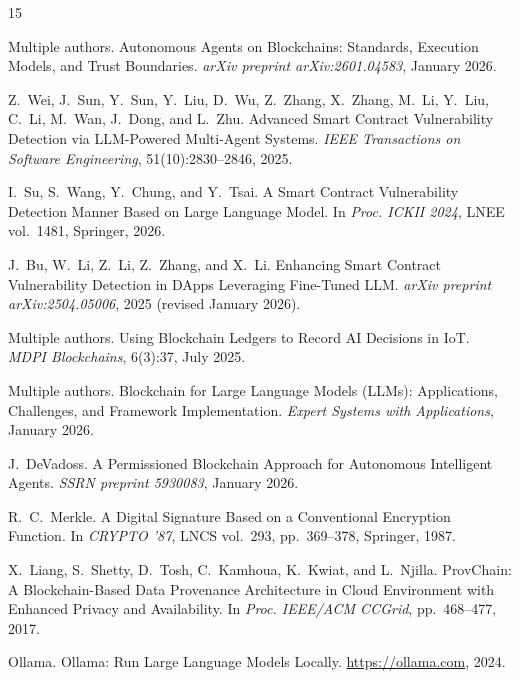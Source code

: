 \documentclass[manuscript,nonacm]{acmart}
\begin{document}
\begin{thebibliography}{15}

Multiple authors.
\newblock Autonomous Agents on Blockchains: Standards, Execution Models, and Trust Boundaries.
\newblock \emph{arXiv preprint arXiv:2601.04583}, January 2026.

Z.~Wei, J.~Sun, Y.~Sun, Y.~Liu, D.~Wu, Z.~Zhang, X.~Zhang, M.~Li, Y.~Liu, C.~Li, M.~Wan, J.~Dong, and L.~Zhu.
\newblock Advanced Smart Contract Vulnerability Detection via LLM-Powered Multi-Agent Systems.
\newblock \emph{IEEE Transactions on Software Engineering}, 51(10):2830--2846, 2025.

I.~Su, S.~Wang, Y.~Chung, and Y.~Tsai.
\newblock A Smart Contract Vulnerability Detection Manner Based on Large Language Model.
\newblock In \emph{Proc. ICKII 2024}, LNEE vol.~1481, Springer, 2026.

J.~Bu, W.~Li, Z.~Li, Z.~Zhang, and X.~Li.
\newblock Enhancing Smart Contract Vulnerability Detection in DApps Leveraging Fine-Tuned LLM.
\newblock \emph{arXiv preprint arXiv:2504.05006}, 2025 (revised January 2026).

Multiple authors.
\newblock Using Blockchain Ledgers to Record AI Decisions in IoT.
\newblock \emph{MDPI Blockchains}, 6(3):37, July 2025.

Multiple authors.
\newblock Blockchain for Large Language Models (LLMs): Applications, Challenges, and Framework Implementation.
\newblock \emph{Expert Systems with Applications}, January 2026.

J.~DeVadoss.
\newblock A Permissioned Blockchain Approach for Autonomous Intelligent Agents.
\newblock \emph{SSRN preprint 5930083}, January 2026.

R.~C.~Merkle.
\newblock A Digital Signature Based on a Conventional Encryption Function.
\newblock In \emph{CRYPTO '87}, LNCS vol.~293, pp.~369--378, Springer, 1987.

X.~Liang, S.~Shetty, D.~Tosh, C.~Kamhoua, K.~Kwiat, and L.~Njilla.
\newblock ProvChain: A Blockchain-Based Data Provenance Architecture in Cloud Environment with Enhanced Privacy and Availability.
\newblock In \emph{Proc. IEEE/ACM CCGrid}, pp.~468--477, 2017.

Ollama.
\newblock Ollama: Run Large Language Models Locally.
\newblock \url{https://ollama.com}, 2024.


\end{thebibliography}
\end{document}
